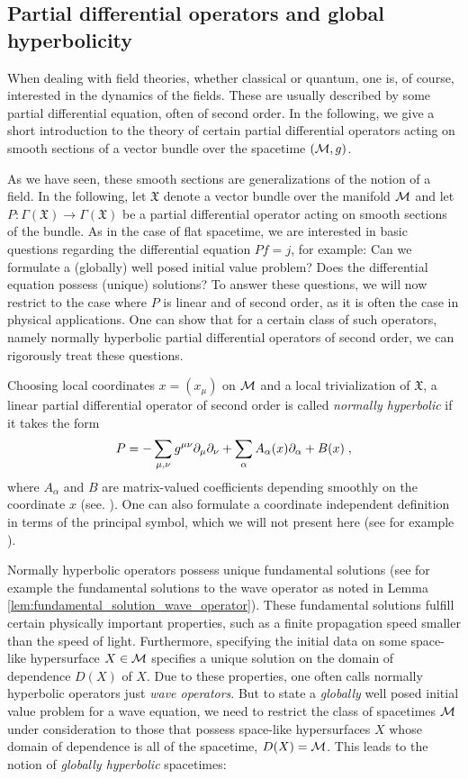\subsection{Partial differential operators and global hyperbolicity}\label{sec:global_hyperbolicity}
When dealing with field theories, whether classical or quantum, one is, of course, interested in the dynamics of the fields. These are usually described by some partial differential equation, often of second order. In the following, we give a short introduction to the theory of certain partial differential operators acting on smooth sections of a vector bundle over the spacetime $(\mathcal{M},g)$.\par
%
As we have seen, these smooth sections are generalizations of the notion of a field.  In the following, let $\mathfrak{X}$ denote a vector bundle over the manifold $\mathcal{M}$ and let $P: \Gamma(\mathfrak{X}) \to \Gamma(\mathfrak{X})$ be a partial differential operator acting on smooth sections of the bundle. As in the case of flat spacetime, we are interested in basic questions regarding the differential equation $Pf = j$, for example: Can we formulate a (globally) well posed initial value problem? Does the differential equation possess (unique) solutions? To answer these questions, we will now restrict to the case where $P$ is linear and of second order, as it is often the case in physical applications. One can show that for a certain class of such operators, namely normally hyperbolic partial differential operators of second order, we can rigorously treat these questions.\par
Choosing local coordinates $x=(x_\mu)$ on $\mathcal{M}$ and a local trivialization of $\mathfrak{X}$, a linear partial differential operator of second order is called \emph{normally hyperbolic} if it takes the form
\begin{align}
	P = - \sum_{\mu,\nu} g^{\mu \nu} \partial_\mu \partial_\nu + \sum_{\alpha} A_\alpha (x) \partial_\alpha + B(x) \;,
\end{align}
where $A_\alpha$ and $B$ are matrix-valued coefficients depending smoothly on the coordinate $x$ (see. \cite[Chapter 1.5]{baer_ginoux_pfaeffle}). One can also formulate a coordinate independent definition in terms of the principal symbol, which we will not present here (see for example \cite[Section 1.5]{baer_ginoux_pfaeffle} ). \par
%
Normally hyperbolic operators possess unique fundamental solutions (see for example the fundamental solutions to the wave operator as noted in Lemma \ref{lem:fundamental_solution_wave_operator}). These fundamental solutions fulfill certain physically important properties, such as a finite propagation speed smaller than the speed of light. Furthermore, specifying the initial data on some space-like hypersurface $X \in  \mathcal{M}$ specifies a unique solution on the domain of dependence $D(X)$ of $X$. Due to these properties, one often calls normally hyperbolic operators just \emph{wave operators}. But to state a \emph{globally} well posed initial value problem for a wave equation, we need to restrict the class of spacetimes $\mathcal{M}$ under consideration to those that possess space-like hypersurfaces $X$ whose domain of dependence is all of the spacetime, $D(X) = \mathcal{M}$. This leads to the notion of \emph{globally hyperbolic} spacetimes:
